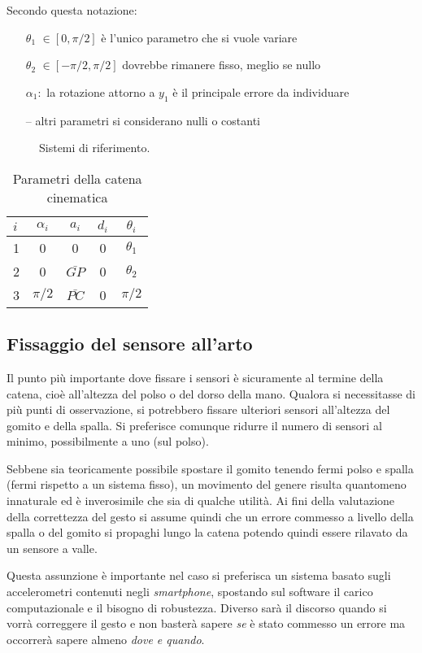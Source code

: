 Secondo questa notazione:
\begin{itemize}
	\item [$\theta_{1}$] {$\in [0, \pi/2]$ \`e l'unico parametro che si vuole variare}
	\item [$\theta_{2}$] {$\in [-\pi/2, \pi/2]$ dovrebbe rimanere fisso, meglio se nullo}
	\item [$\alpha_{1}:$] la rotazione attorno a $y_{1}$ \`e il principale errore da individuare
	\item [--] {altri parametri si considerano nulli o costanti}
\end{itemize}

\begin{figure}
  \centering
    
  \caption{Sistemi di riferimento.}
  \label{fig:gomito1}
\end{figure}

\begin{table}
\centering
\caption{Parametri della catena cinematica}
\label{tab:robo}
\begin{tabular} {l c c c c}
	\hline
	$i$ & $\alpha_{i}$ & $a_{i}$ & $d_{i}$ & $\theta_{i}$\\
	\hline
	1 & 0 & 0 & 0 & $\theta_{1}$ \\
	2 & 0 & $\bar{GP}$ & 0 & $\theta_{2}$ \\
	3 & $\pi/2$ & $\bar{PC}$ & 0 & $\pi/2$ \\
	\hline
\end{tabular}
\end{table}





\subsection{Fissaggio del sensore all'arto}
\label{ssez:fissaggio}

Il punto più importante dove fissare i sensori è sicuramente al termine della catena,
cioè all'altezza del polso o del dorso della mano.
Qualora si necessitasse di più punti di osservazione,
si potrebbero fissare ulteriori sensori all'altezza del gomito e della spalla.
Si preferisce comunque ridurre il numero di sensori al minimo,
possibilmente a uno (sul polso).

Sebbene sia teoricamente possibile spostare il gomito
tenendo fermi polso e spalla (fermi rispetto a un sistema fisso),
un movimento del genere risulta quantomeno innaturale
ed è inverosimile che sia di qualche utilità.
Ai fini della valutazione della correttezza del gesto
si assume quindi che un errore commesso a livello della spalla
o del gomito si propaghi lungo la catena
potendo quindi essere rilavato da un sensore a valle.

Questa assunzione è importante nel caso si preferisca
un sistema basato sugli accelerometri contenuti negli \textit{smartphone},
spostando sul software il carico computazionale
e il bisogno di robustezza.
Diverso sarà il discorso quando si vorrà correggere il gesto
e non basterà sapere \emph{se} è stato commesso un errore
ma occorrerà sapere almeno \emph{dove e quando}.

